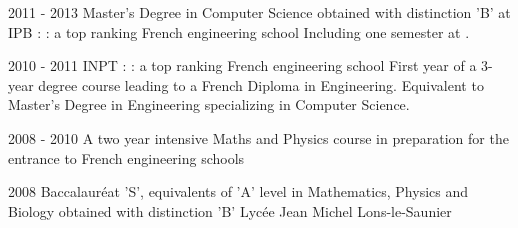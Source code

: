\cventry
{2011 - 2013}
{Master's Degree in Computer Science}
{obtained with distinction 'B' at IPB :  : a top ranking French engineering school}
{}
{}
{	
	Including one semester at .
}


\cventry
{2010 - 2011}
{INPT :  : a top ranking French engineering school}
{}
{}
{}
{
	First year of a 3-year degree  course leading to a French Diploma in Engineering. Equivalent to Master's Degree in Engineering
	specializing in Computer Science.
}

\cventry
{2008 - 2010}
{A two year intensive Maths and Physics course in preparation for the entrance
to French engineering schools}
{}
{}
{}
{}

\cventry
{2008}
{Baccalauréat 'S', equivalents of 'A' level in Mathematics, Physics and Biology obtained with distinction 'B'}
{Lycée Jean Michel}
{Lons-le-Saunier}
{}
{}

